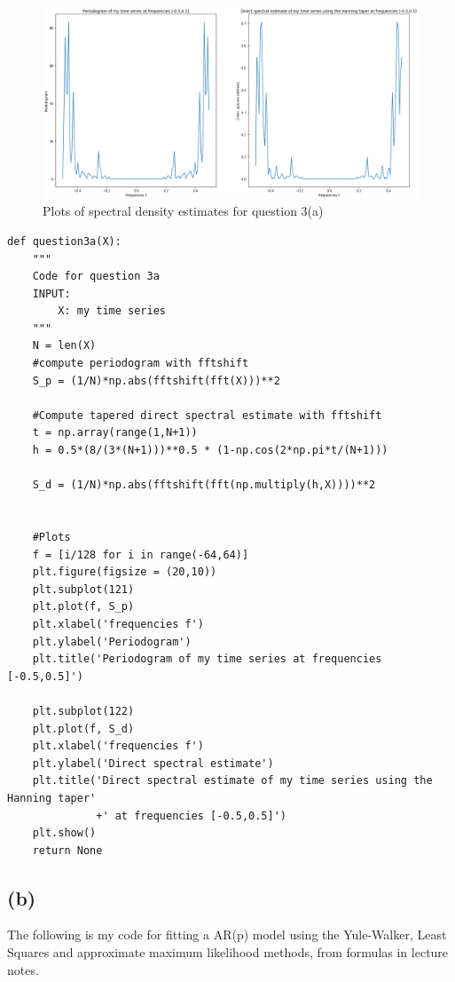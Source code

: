 \documentclass[a4paper,10pt]{article}
\theoremstyle{mytheor}
\begin{document}
\begin{figure}[h!]
    \centering
    \includegraphics[width=\columnwidth]{plot3a.png}
    \caption{Plots of spectral density estimates for question 3(a)}
    \label{plot3a}
\end{figure}

\begin{lstlisting}
def question3a(X):
    """
    Code for question 3a 
    INPUT:
        X: my time series
    """
    N = len(X)
    #compute periodogram with fftshift
    S_p = (1/N)*np.abs(fftshift(fft(X)))**2
    
    #Compute tapered direct spectral estimate with fftshift
    t = np.array(range(1,N+1))
    h = 0.5*(8/(3*(N+1)))**0.5 * (1-np.cos(2*np.pi*t/(N+1)))
    
    S_d = (1/N)*np.abs(fftshift(fft(np.multiply(h,X))))**2
    
    
    #Plots
    f = [i/128 for i in range(-64,64)]
    plt.figure(figsize = (20,10))
    plt.subplot(121)
    plt.plot(f, S_p)
    plt.xlabel('frequencies f')
    plt.ylabel('Periodogram')
    plt.title('Periodogram of my time series at frequencies [-0.5,0.5]')
    
    plt.subplot(122)
    plt.plot(f, S_d)
    plt.xlabel('frequencies f')
    plt.ylabel('Direct spectral estimate')
    plt.title('Direct spectral estimate of my time series using the Hanning taper'
              +' at frequencies [-0.5,0.5]')
    plt.show() 
    return None       
\end{lstlisting}
\subsection*{(b)}

The following is my code for fitting a AR(p) model using the Yule-Walker, Least Squares and approximate maximum likelihood methods, from formulas in lecture notes.
\end{document}
